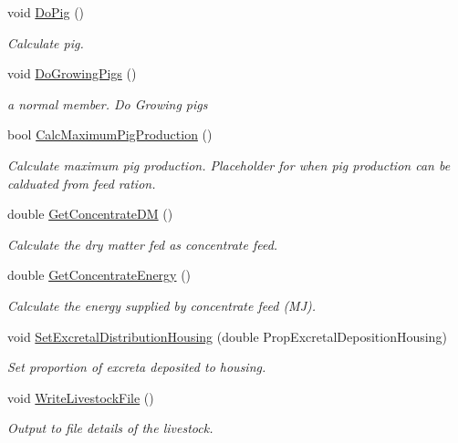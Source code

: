 \begin{DoxyCompactItemize}
void \mbox{\hyperlink{classlivestock_a4d2339d509e3977e72d2299f6b13a6c1}{Do\+Pig}} ()
\begin{DoxyCompactList}\small\item\em Calculate pig. \end{DoxyCompactList}\item 
void \mbox{\hyperlink{classlivestock_aeff04ec4200c0e18934cf3d0084fb187}{Do\+Growing\+Pigs}} ()
\begin{DoxyCompactList}\small\item\em a normal member. Do Growing pigs \end{DoxyCompactList}\item 
bool \mbox{\hyperlink{classlivestock_a01c291e9fb7f5a9ca29cbadf7bc1be08}{Calc\+Maximum\+Pig\+Production}} ()
\begin{DoxyCompactList}\small\item\em Calculate maximum pig production. Placeholder for when pig production can be calduated from feed ration. \end{DoxyCompactList}\item 
double \mbox{\hyperlink{classlivestock_aae3e79cb0aad2d69a5a1a2a97956f23b}{Get\+Concentrate\+DM}} ()
\begin{DoxyCompactList}\small\item\em Calculate the dry matter fed as concentrate feed. \end{DoxyCompactList}\item 
double \mbox{\hyperlink{classlivestock_aa8d54b87c79101f0633184a7929d5ab9}{Get\+Concentrate\+Energy}} ()
\begin{DoxyCompactList}\small\item\em Calculate the energy supplied by concentrate feed (MJ). \end{DoxyCompactList}\item 
void \mbox{\hyperlink{classlivestock_aae778774f618bd97cf190c55e8ad179f}{Set\+Excretal\+Distribution\+Housing}} (double Prop\+Excretal\+Deposition\+Housing)
\begin{DoxyCompactList}\small\item\em Set proportion of excreta deposited to housing. \end{DoxyCompactList}\item 
void \mbox{\hyperlink{classlivestock_a23c5edb2e2568bbcbe7357d56b6a5fb9}{Write\+Livestock\+File}} ()
\begin{DoxyCompactList}\small\item\em Output to file details of the livestock. \end{DoxyCompactList}\end{DoxyCompactItemize}
